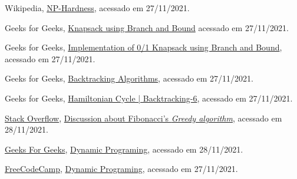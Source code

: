 \begin{thebibliography}{10}

  Wikipedia,
  \href{https://en.wikipedia.org/wiki/NP-hardness}{NP-Hardness},
  acessado em 27/11/2021.
  
  Geeks for Geeks,
  \href{https://www.geeksforgeeks.org/0-1-knapsack-using-branch-and-bound/}{Knapsack using Branch and Bound}
  acessado em 27/11/2021.
  
  Geeks for Geeks,
  \href{https://www.geeksforgeeks.org/implementation-of-0-1-knapsack-using-branch-and-bound/}{Implementation of 0/1 Knapsack using Branch and Bound},
  acessado em 27/11/2021.
  
  Geeks for Geeks,
  \href{https://www.geeksforgeeks.org/backtracking-algorithms/#standard}{Backtracking Algorithms},
  acessado em 27/11/2021.

  Geeks for Geeks,
  \href{https://www.geeksforgeeks.org/hamiltonian-cycle-backtracking-6/}{Hamiltonian Cycle | Backtracking-6},
  acessado em 27/11/2021.


  \href{https://stackoverflow.com/}{Stack Overflow},
  \href{https://stackoverflow.com/questions/52869474/implementing-fibonacci-series-using-greedy-approach}{Discussion about Fibonacci's \emph{Greedy algorithm}},
  acessado em 28/11/2021. 

  \href{https://www.geeksforgeeks.org/}{Geeks For Geeks},
  \href{https://www.geeksforgeeks.org/dynamic-programming/}{Dynamic Programing},
  acessado em 28/11/2021.
  
    \href{https://www.freecodecamp.org}{FreeCodeCamp},
    \href{https://youtu.be/oBt53YbR9Kk?t=210}{Dynamic Programing},
    acessado em 27/11/2021.

  

\end{thebibliography}